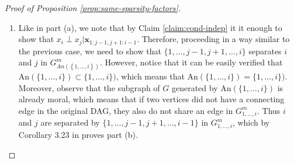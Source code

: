 \documentclass[12pt,letterpaper]{article}
\theoremstyle{propstyle}
\theoremstyle{propstyle}
\theoremstyle{propstyle}
\theoremstyle{propstyle}
\theoremstyle{propstyle}
\newcommand{\bx}{\mathbf{x}}
\newcommand{\sx}{\mathcal{X}}
\newcommand{\sa}{\mathcal{A}}
\newcommand{\condset}{\mathcal{C}}
\newcommand{\im}{{i_1,\ldots,i_m}}
\newcommand{\jl}{{j_1,\ldots,j_\ell}}
\newcommand{\An}{\text{An}}
\begin{document}
\begin{proof}[Proof of Proposition \ref{prop:same-sparsity-factors}]
\begin{enumerate}
\begin{enumerate}
There are four cases we need to consider and we show that each one of them leads to a contradiction. First, assume that the last edge in the path is $h_k \rightarrow j$. This violates observation [2]. Second, assume that the first edge is $i \leftarrow h_1$. But because of [1] we know that $h_1<i$, and by [2] we get a contradiction again. Third, let the path be of the form $i \rightarrow h_1 \leftarrow \dots \leftarrow h_k \leftarrow j$ (i.e., all edges are of the form $h_r \leftarrow h_{r+1}$). However, this would mean that $\sx_\jl \subset \sa_\im$, for $x_i\in \sx_\im$ and $x_j\in \sx_\jl$. This implies that $j \in \condset_i$, which in turn contradicts the assumption of the proposition. Finally, the only possibility we have not excluded yet is a path such that $i\leftarrow h_1 \dots h_k \leftarrow j$ with some edges of the form $h_r \rightarrow h_{r+1}$. Consider the largest $r$ for which this is true. Then by [3] there has to exist an edge $h_r \leftarrow h_p$ where $h_p \in \{h_{r+2}, \dots, h_k, j\}$. But this means that $j$ is an ancestor of $h_r$ so the path can be reduced to $i \rightarrow h_1, \dots h_r \rightarrow j$. We continue in this way for each edge "$\leftarrow$" which reduces this path to case 3 and leads to a contradiction. 

Thus we showed that all paths in $G_{An\left(\left\{1, \dots, j, i\right\}\right)}^m$ connecting $i$ and $j$ necessarily have be contained in $\left\{1, \dots, j-1\right\}$, which proves Proposition \ref{prop:same-sparsity-factors}.1.a.

    \item 
Like in part (a), we note that by Claim \ref{claim:cond-indep} it it enough to show that $x_i \perp x_j | \bx_{1:j-1, j+1:i-1}$. Therefore, proceeding in a way similar to the previous case, we need to show that $\{1, \dots, j-1, j+1, \dots, i\}$ separates $i$ and $j$ in $G_{An\left(\left\{1, \dots, i\right\}\right)}^m$. 
    However, notice that it can be easily verified that $\An(\{1, \dots, i\}) \subset \{1, \dots, i\})$, which means that $\An(\{1, \dots, i\}) = \{1, \dots, i\})$. Moreover, observe that the subgraph of $G$ generated by $\An(\{1, \dots, i\})$ is already moral, which means that if two vertices did not have a connecting edge in the original DAG, they also do not share an edge in $G^m_{1, \dots, i}$. Thus $i$ and $j$ are separated by $\{1, \dots, j-1, j+1, \dots, i-1\}$ in $G^m_{1, \dots, i}$, which by Corollary 3.23 in \citep{lauritzen1996graphical} proves part (b).

\end{enumerate}


\end{enumerate}
\end{proof}
\end{document}
